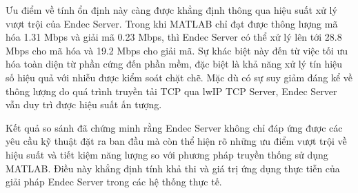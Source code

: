 \documentclass[../DoAn.tex]{subfiles}
\begin{document}
Ưu điểm về tính ổn định này càng được khẳng định thông qua hiệu suất xử lý vượt trội của Endec Server. Trong khi MATLAB chỉ đạt được thông lượng mã hóa 1.31 Mbps và giải mã 0.23 Mbps, thì Endec Server có thể xử lý lên tới 28.8 Mbps cho mã hóa và 19.2 Mbps cho giải mã. Sự khác biệt này đến từ việc tối ưu hóa toàn diện từ phần cứng đến phần mềm, đặc biệt là khả năng xử lý tín hiệu số hiệu quả với nhiễu được kiểm soát chặt chẽ. Mặc dù có sự suy giảm đáng kể về thông lượng do quá trình truyền tải TCP qua lwIP TCP Server, Endec Server vẫn duy trì được hiệu suất ấn tượng.

Kết quả so sánh đã chứng minh rằng Endec Server không chỉ đáp ứng được các yêu cầu kỹ thuật đặt ra ban đầu mà còn thể hiện rõ những ưu điểm vượt trội về hiệu suất và tiết kiệm năng lượng so với phương pháp truyền thống sử dụng MATLAB. Điều này khẳng định tính khả thi và giá trị ứng dụng thực tiễn của giải pháp Endec Server trong các hệ thống thực tế.
\end{document}
